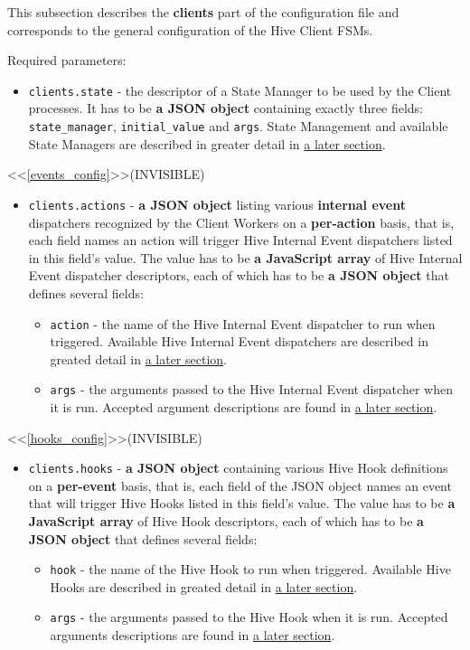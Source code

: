\documentclass[a4paper]{article}
\begin{document}
This subsection describes the \textbf{clients} part of the configuration file and corresponds to the general configuration of the Hive Client FSMs.

\noindent
Required parameters:


\begin{itemize}
\item \texttt{clients.state} - the descriptor of a State Manager to be used by the Client processes. It has to be \textbf{a JSON object} containing exactly three fields: \texttt{state\_manager}, \texttt{initial\_value} and \texttt{args}. State Management and available State Managers are described in greater detail in \hyperref[sec-7-1-5]{a later section}.
\end{itemize}

<<\ref{events_config}>>(INVISIBLE)

\begin{itemize}
\item \texttt{clients.actions} - \textbf{a JSON object} listing various \textbf{internal event} dispatchers recognized by the Client Workers on a \textbf{per-action} basis, that is, each field names an action will trigger Hive Internal Event dispatchers listed in this field's value. The value has to be \textbf{a JavaScript array} of Hive Internal Event dispatcher descriptors, each of which has to be \textbf{a JSON object} that defines several fields:
\begin{itemize}
\item \texttt{action} - the name of the Hive Internal Event dispatcher to run when triggered. Available Hive Internal Event dispatchers are described in greated detail in \hyperref[sec-8-3]{a later section}.
\item \texttt{args} - the arguments passed to the Hive Internal Event dispatcher when it is run. Accepted argument descriptions are found in \hyperref[sec-8-3]{a later section}.
\end{itemize}
\end{itemize}

<<\ref{hooks_config}>>(INVISIBLE)

\begin{itemize}
\item \texttt{clients.hooks} - \textbf{a JSON object} containing various Hive Hook definitions on a \textbf{per-event} basis, that is, each field of the JSON object names an event that will trigger Hive Hooks listed in this field's value. The value has to be \textbf{a JavaScript array} of Hive Hook descriptors, each of which has to be \textbf{a JSON object} that defines several fields:
\begin{itemize}
\item \texttt{hook} - the name of the Hive Hook to run when triggered. Available Hive Hooks are described in greated detail in \hyperref[sec-8-2]{a later section}.
\item \texttt{args} - the arguments passed to the Hive Hook when it is run. Accepted arguments descriptions are found in \hyperref[sec-8-2]{a later section}.
\end{itemize}
\end{itemize}
\end{document}
